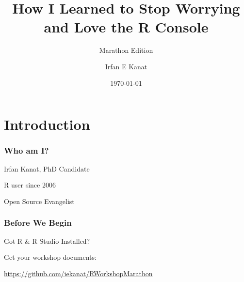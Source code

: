 \documentclass{beamer}\usepackage[]{graphicx}\usepackage[]{color}
\newcommand\makebeamertitle{\frame{\maketitle}}%
\begin{document}
\title[R Workshop]{How I Learned to Stop Worrying and Love the R Console}
\subtitle{Marathon Edition}

\author[Irfan Kanat]{Irfan E Kanat}



\date{\today}



\makebeamertitle


\section{Introduction}

\begin{frame}
\frametitle{Who am I?}

Irfan Kanat, PhD Candidate

\vspace*{2em} R user since 2006

\vspace*{2em} Open Source Evangelist

\end{frame}


\begin{frame}[fragile]
\frametitle{Before We Begin}
{\Large
Got R \& R Studio Installed? \vfill

Get your workshop documents: \vfill

\href{https://github.com/iekanat/RWorkshopMarathon}{https://github.com/iekanat/RWorkshopMarathon} \vfill

}
\end{frame}
\end{document}
